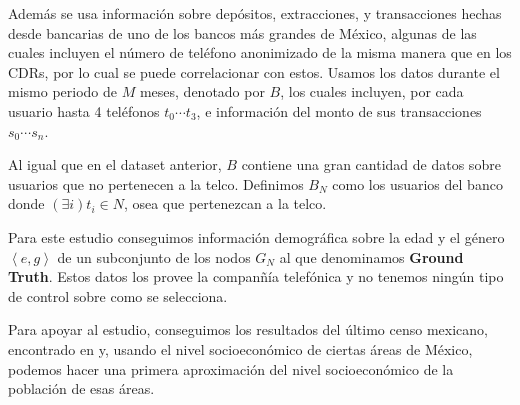 \documentclass[
10pt,
spanish,
singlespacing, %
parskip, %
headsepline, %
twocolumn
]{article} %
\begin{document}
Adem\'as se usa informaci\'on sobre dep\'ositos, extracciones, y transacciones hechas desde bancarias de uno de los bancos m\'as grandes de M\'exico, algunas de las cuales incluyen el n\'umero de tel\'efono anonimizado de la misma manera que en los CDRs, por lo cual se puede correlacionar con estos. Usamos los datos durante el mismo periodo de \( M \) meses, denotado por \( B \), los cuales incluyen, por cada usuario hasta 4 tel\'efonos \( t_0 \cdots t_3 \), e informaci\'on del monto de sus transacciones \( s_0 \cdots s_n \).

Al igual que en el dataset anterior, \( B \) contiene una gran cantidad de datos sobre usuarios que no pertenecen a la telco. Definimos \( B_N \) como los usuarios del banco donde \( \left( \exists i \right) t_i \in N \), osea que pertenezcan a la telco.

Para este estudio conseguimos informaci\'on demogr\'afica sobre la edad y el g\'enero \( \left<e, g\right> \) de un subconjunto de los nodos \( G_N \) al que denominamos \textbf{Ground Truth}. Estos datos los provee la compan\~n\'ia telef\'onica y no tenemos ning\'un tipo de control sobre como se selecciona.

Para apoyar al estudio, conseguimos los resultados del \'ultimo censo mexicano, encontrado en  y, usando el nivel socioecon\'omico de ciertas \'areas de M\'exico, podemos hacer una primera aproximaci\'on del nivel socioecon\'omico de la poblaci\'on de esas \'areas.
\end{document}
